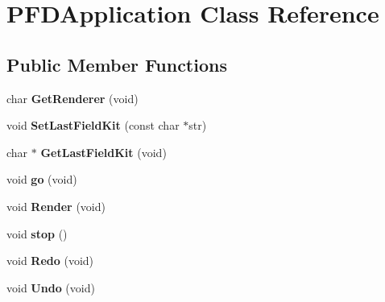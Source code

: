 \hypertarget{class_p_f_d_application}{
\section{PFDApplication Class Reference}
\label{class_p_f_d_application}
}
\subsection*{Public Member Functions}
\begin{DoxyCompactItemize}
\item 
\hypertarget{class_p_f_d_application_a2c2c0a4b46fd684858f259572a250e7e}{
char {\bfseries GetRenderer} (void)}
\label{class_p_f_d_application_a2c2c0a4b46fd684858f259572a250e7e}

\item 
\hypertarget{class_p_f_d_application_a5fd70a79e381baccb9520fd21d6152d9}{
void {\bfseries SetLastFieldKit} (const char $\ast$str)}
\label{class_p_f_d_application_a5fd70a79e381baccb9520fd21d6152d9}

\item 
\hypertarget{class_p_f_d_application_a3cc8ceba1cdd0a44ce85502c82c1c16f}{
char $\ast$ {\bfseries GetLastFieldKit} (void)}
\label{class_p_f_d_application_a3cc8ceba1cdd0a44ce85502c82c1c16f}

\item 
\hypertarget{class_p_f_d_application_a6dfc08d3c1349b282095c1a781cdb884}{
void {\bfseries go} (void)}
\label{class_p_f_d_application_a6dfc08d3c1349b282095c1a781cdb884}

\item 
\hypertarget{class_p_f_d_application_a285aed9a14be7de7fe07aaa201f0381d}{
void {\bfseries Render} (void)}
\label{class_p_f_d_application_a285aed9a14be7de7fe07aaa201f0381d}

\item 
\hypertarget{class_p_f_d_application_a1ad95948095b98b06167074619873094}{
void {\bfseries stop} ()}
\label{class_p_f_d_application_a1ad95948095b98b06167074619873094}

\item 
\hypertarget{class_p_f_d_application_a0e70c50b25c16869ef21b0892d13043d}{
void {\bfseries Redo} (void)}
\label{class_p_f_d_application_a0e70c50b25c16869ef21b0892d13043d}

\item 
\hypertarget{class_p_f_d_application_a9f4b9a6fb244222c2e1fd2f7a4aa709e}{
void {\bfseries Undo} (void)}
\label{class_p_f_d_application_a9f4b9a6fb244222c2e1fd2f7a4aa709e}


\end{DoxyCompactItemize}
